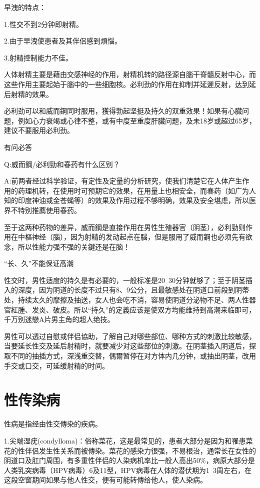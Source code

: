 \documentclass[12pt,UTF8]{ctexbook}
\begin{document}
早洩的特点：

1.性交不到2分钟即射精。

2.由于早洩使患者及其伴侣感到煩惱。

3.射精控制能力不佳。

人体射精主要是藉由交感神经的作用，射精机转的路径源自腦干脊髓反射中心，而这些作用主要起始于腦中的一些细胞核。必利劲的作用在抑制并延遲反射，达到延后射精的效果。

必利劲可以和威而鋼同时服用，獲得勃起坚挺及持久的双重效果！如果有心臓问题，例如心力衰竭或心律不整，或有中度至重度肝臟问题，及未18岁或超过65岁，建议不要服用必利劲。

有问必答

Q:威而鋼/必利勁和春药有什么区别？

A:前两者经过科学验证，有定性及定量的分析研究，使我们清楚它在人体产生作用的药理机转，在使用时可预期它的效果，在用量上也相安全，而春药（如广为人知的印度神油或金苍蝇等）的效果及作用过程不够明确，效果及安全堪虑，所以医界不特别推薦使用春药。

至于这两种药物的差异，威而鋼是直接作用在男性生殖器官（阴茎），必利勁则作用在中樞神经（腦），因为射精的发动起点在腦，但是服用了威而鋼也必须先有欲念，所以性能力强不强的关鍵还是在脑！

“长、久”不能保证高潮

性交时，男性适度的持久是有必要的，一般标准是20~30分钟就够了；至于阴茎插入的深度，因为阴道的长度不过只有8、9公分，且最敏感处在阴道口前段到阴蒂处，持续太久的摩擦及抽送，女人也会吃不消，容易使阴道分泌物不足、两人性器官紅腫、发炎、破皮。所以“持久”的定義应该是使双方均能维持到高潮来临即可，千万别迷戀A片男主角的超人绝技。

男性可以透过自慰或伴侣協助，了解自己对哪些部位、哪种方式的刺激比较敏感，当要延长性交及延后射精时，就要减少对这些部位的刺激。在阴茎插入阴道后，探取不同的抽插方式，深浅重交替，偶爾暂停在对方体内几分钟，或抽出阴茎，改用手交或口交，可延缓射精的时间。

\part{性传染病}

性病是指经由性交傳染的疾病。

1.尖端湿疣(condylloma)：俗称菜花，这是最常见的，患者大部分是因为和罹患菜花的性伴侣发生性关系而被傳染。菜花的感染力很强，不易根治，通常长在女性的阴道口及肛门周围，有多重性伴侣的人染病机率比一般人高出50\%，病原大部分是人类乳突病毒（HPV病毒）6及11型，HPV病毒在人体的潜伏期为1~3周左右，在这段空窗期间如果与他人性交，便有可能转傳给他人，使人染病。
\end{document}
